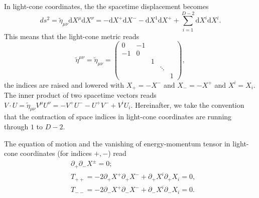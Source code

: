 \documentclass[graybox,envcountchap,sectrefs]{svmono}
\begin{document}
In light-cone coordinates, the the spacetime displacement becomes
\begin{equation}
ds^2=\tilde{\eta}_{\mu\nu}\mathrm{d}X^{\mu}\mathrm{d}X^{\nu}=-\mathrm{d}X^+\mathrm{d}X^{-}-\mathrm{d}X^1\mathrm{d}X^{+}+\sum_{i=1}^{D-2}\mathrm{d}X^i\mathrm{d}X^i.
\end{equation}
This means that the light-cone metric reads
\begin{equation}
\tilde{\eta}^{\mu\nu}=\tilde{\eta}_{\mu\nu}=
\left(\begin{array}{ccccc}0 & -1 &  &  &  \\-1 & 0 &  &  &  \\ &  & 1 &  &  \\ & &  & \ddots &  \\ &  &  &  & 1\end{array}\right),
\end{equation}
the indices are raised and lowered with $X_{+}=-X^{-}$ and $X_{-}=-X^{+}$ and $X^i=X_i$. The inner product of two spacetime vectors reads $V\cdot U=\tilde{\eta}_{\mu\nu}V^{\mu}U^{\nu}=-V^+U^{-} -U^{+}V^{-}+V^{i}U_{i}$. Hereinafter, we take the convention that the contraction of space indices in light-cone coordinates are running through $1$ to $D-2$.

The equation of motion and the vanishing of energy-momentum tensor in light-cone coordinates (for indices $+,-$) read
\begin{align}
&\partial_{+}\partial_{-}X^{\pm}=0; \label{eq:eqom}\\
&T_{++}=-2\partial_{+}X^{+}\partial_{+}X^{-}+\partial_{+}X^{i}\partial_{+}X_{i}=0, \label{eq:vpp}\\
&T_{--}=-2\partial_{-}X^{+}\partial_{-}X^{-}+\partial_{-}X^{i}\partial_{-}X_{i}=0. \label{eq:vmm}
\end{align}
\end{document}
